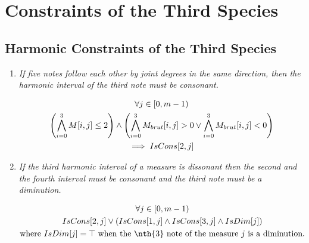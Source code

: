 \section*{Constraints of the Third Species}
\subsection*{Harmonic Constraints of the Third Species}
\begin{enumerate}[wide, label=\bfseries 3.H\arabic*]
  \item\label{rule:fivequarters}{ \textit{If five notes follow each other by joint degrees in the same direction, then the harmonic interval of the third note must be consonant.}}

\begin{equation}
    \begin{gathered}
        \forall j \in [0, m-1)\\
        \left(
            \bigwedge_{i=0}^{3} M[i, j] \leq 2
        \right)
        \land
        \left(
            \bigwedge_{i=0}^{3} M_{brut}[i, j] > 0
            \lor
            \bigwedge_{i=0}^{3} M_{brut}[i, j] < 0
        \right)\\
        \implies IsCons[2, j]
    \end{gathered}
\end{equation}


\item\label{rule:thirddiss} {\textit{If the third harmonic interval of a measure is dissonant then the second and the fourth interval must be consonant and the third note must be a diminution.}}


\begin{equation}
    \begin{gathered}
        \forj\\
        IsCons[2, j] \lor \left( IsCons[1, j] \land IsCons[3, j] \land IsDim[j]\right)\\
        \text{where } IsDim[j]=\top \text{ when the \nth{3} note of the measure } j \text{ is a diminution.}
    \end{gathered}
\end{equation}


\end{enumerate}
